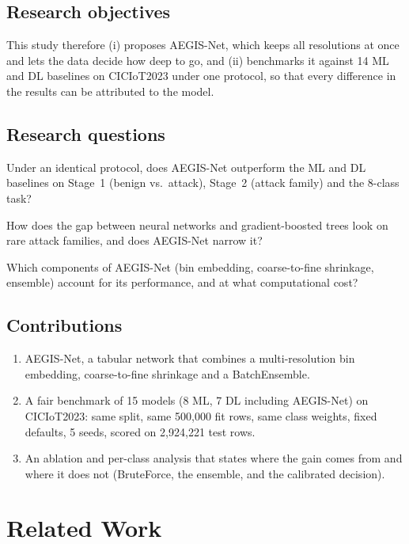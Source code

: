 \documentclass[11pt,a4paper]{article}
\newcommand{\aegis}{AEGIS-Net}
\begin{document}
\subsection{Research objectives}
This study therefore (i) proposes \aegis, which keeps all resolutions at once and lets the data decide how deep to go, and (ii) benchmarks it against 14 ML and DL baselines on CICIoT2023 under one protocol, so that every difference in the results can be attributed to the model.

\subsection{Research questions}
\begin{description}[leftmargin=1.2cm,style=nextline]
  \item[RQ1] Under an identical protocol, does \aegis{} outperform the ML and DL baselines on Stage~1 (benign vs.\ attack), Stage~2 (attack family) and the 8-class task?
  \item[RQ2] How does the gap between neural networks and gradient-boosted trees look on rare attack families, and does \aegis{} narrow it?
  \item[RQ3] Which components of \aegis{} (bin embedding, coarse-to-fine shrinkage, ensemble) account for its performance, and at what computational cost?
\end{description}

\subsection{Contributions}
\begin{enumerate}
  \item \aegis, a tabular network that combines a multi-resolution bin embedding, coarse-to-fine shrinkage and a BatchEnsemble.
  \item A fair benchmark of 15 models (8 ML, 7 DL including \aegis) on CICIoT2023: same split, same 500{,}000 fit rows, same class weights, fixed defaults, 5 seeds, scored on 2{,}924{,}221 test rows.
  \item An ablation and per-class analysis that states where the gain comes from and where it does not (BruteForce, the ensemble, and the calibrated decision).
\end{enumerate}

\section{Related Work}
\end{document}
